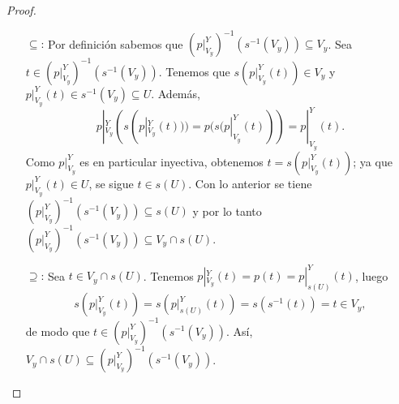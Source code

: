 \begin{proof}
\begin{itemize}
      \begin{itemize}
         \item[$\subseteq$:] Por definición sabemos que $(p|^Y_{V_y})^{-1}(s^{-1}(V_y))\subseteq V_y$. Sea $t\in (p|^Y_{V_y})^{-1}(s^{-1}(V_y))$. Tenemos que $s(p|^Y_{V_y}(t))\in V_y$ y $p|^Y_{V_y}(t)\in s^{-1}(V_y)\subseteq U$. Además,
            $$
               p|^Y_{V_y}(s(p|^Y_{V_y}(t)))= p(s(p|^Y_{V_y}(t)))=p|^Y_{V_y}(t).
            $$
            Como $p|^Y_{V_y}$ es en particular inyectiva, obtenemos $t=s(p|^Y_{V_y}(t))$; ya que $p|^Y_{V_y}(t)\in U$, se sigue $t\in s(U)$. Con lo anterior se tiene $(p|^Y_{V_y})^{-1}(s^{-1}(V_y))\subseteq s(U)$ y por lo tanto $(p|^Y_{V_y})^{-1}(s^{-1}(V_y))\subseteq V_y\cap s(U)$.
         \item[$\supseteq$:] Sea $t\in V_y\cap s(U)$. Tenemos $p|^Y_{V_y}(t)=p(t)=p|^Y_{s(U)}(t)$, luego
            $$
               s(p|^Y_{V_y}(t))=s(p|^Y_{s(U)}(t))=s(s^{-1}(t))=t\in V_y,
            $$
            de modo que $t\in (p|^Y_{V_y})^{-1}(s^{-1}(V_y))$. Así, $V_y\cap s(U)\subseteq (p|^Y_{V_y})^{-1}(s^{-1}(V_y))$. 
      \end{itemize}
   \end{itemize}
\end{proof}
